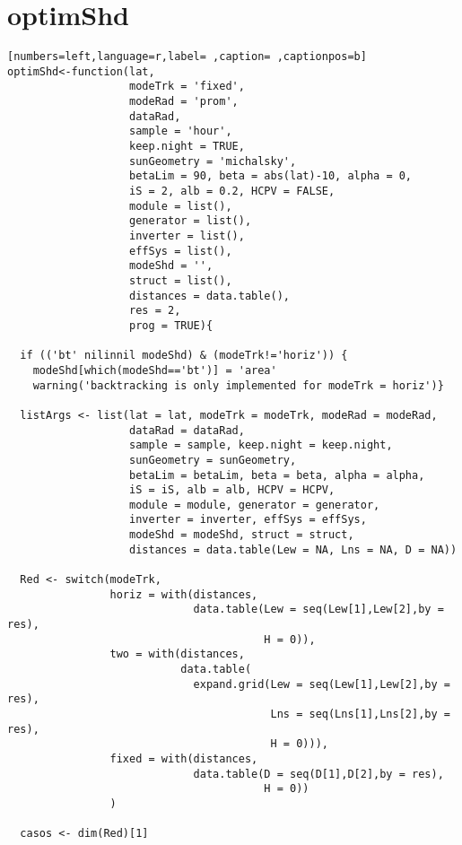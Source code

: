 \section{optimShd}
\label{sec:org7a16e35}
\begin{lstlisting}[numbers=left,language=r,label= ,caption= ,captionpos=b]
optimShd<-function(lat,
                   modeTrk = 'fixed', 
                   modeRad = 'prom', 
                   dataRad,
                   sample = 'hour',
                   keep.night = TRUE,
                   sunGeometry = 'michalsky',
                   betaLim = 90, beta = abs(lat)-10, alpha = 0,
                   iS = 2, alb = 0.2, HCPV = FALSE,
                   module = list(), 
                   generator = list(),
                   inverter = list(), 
                   effSys = list(), 
                   modeShd = '',    
                   struct = list(), 
                   distances = data.table(),
                   res = 2,      
                   prog = TRUE){ 

  if (('bt' nilinnil modeShd) & (modeTrk!='horiz')) {
    modeShd[which(modeShd=='bt')] = 'area'
    warning('backtracking is only implemented for modeTrk = horiz')}

  listArgs <- list(lat = lat, modeTrk = modeTrk, modeRad = modeRad,
                   dataRad = dataRad,
                   sample = sample, keep.night = keep.night,
                   sunGeometry = sunGeometry,
                   betaLim = betaLim, beta = beta, alpha = alpha,
                   iS = iS, alb = alb, HCPV = HCPV,
                   module = module, generator = generator,
                   inverter = inverter, effSys = effSys,
                   modeShd = modeShd, struct = struct,
                   distances = data.table(Lew = NA, Lns = NA, D = NA))

  Red <- switch(modeTrk,
                horiz = with(distances,
                             data.table(Lew = seq(Lew[1],Lew[2],by = res),
                                        H = 0)),
                two = with(distances,
                           data.table(
                             expand.grid(Lew = seq(Lew[1],Lew[2],by = res),
                                         Lns = seq(Lns[1],Lns[2],by = res),
                                         H = 0))),
                fixed = with(distances,
                             data.table(D = seq(D[1],D[2],by = res),
                                        H = 0))
                )

  casos <- dim(Red)[1]


\end{lstlisting}
